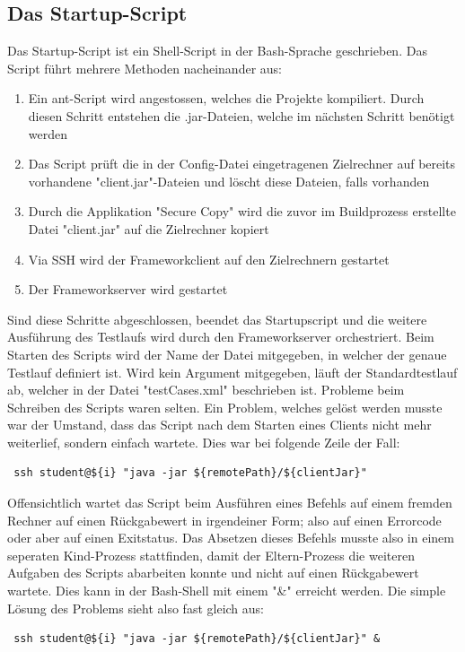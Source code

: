 \subsection{Das Startup-Script}
\label{sec:startupScript}
Das  Startup-Script ist ein Shell-Script in der Bash-Sprache geschrieben. Das Script führt mehrere Methoden nacheinander aus:
\begin{enumerate}
\item Ein ant-Script wird angestossen, welches die Projekte kompiliert. Durch diesen Schritt entstehen die .jar-Dateien, welche im nächsten Schritt benötigt werden
\item Das Script prüft die in der Config-Datei eingetragenen Zielrechner auf bereits vorhandene "client.jar"-Dateien und löscht diese Dateien, falls vorhanden
\item Durch die Applikation "Secure Copy" wird die zuvor im Buildprozess erstellte Datei "client.jar" auf die Zielrechner kopiert
\item Via SSH wird der Frameworkclient auf den Zielrechnern gestartet
\item Der Frameworkserver wird gestartet
\end{enumerate}
Sind diese Schritte abgeschlossen, beendet das Startupscript und die weitere Ausführung des Testlaufs wird durch den Frameworkserver orchestriert.
Beim Starten des Scripts wird der Name der Datei mitgegeben, in welcher der genaue Testlauf definiert ist. Wird kein Argument mitgegeben, läuft der Standardtestlauf ab, welcher in der Datei "testCases.xml" beschrieben ist.
Probleme beim Schreiben des Scripts waren selten. Ein Problem, welches gelöst werden musste war der Umstand, dass das Script nach dem Starten eines Clients nicht mehr weiterlief, sondern einfach wartete. Dies war bei folgende Zeile der Fall:
\begin{lstlisting}	
 ssh student@${i} "java -jar ${remotePath}/${clientJar}"
\end{lstlisting}	
Offensichtlich wartet das Script beim Ausführen eines Befehls auf einem fremden Rechner auf einen Rückgabewert in irgendeiner Form; also auf einen Errorcode oder aber auf einen Exitstatus. Das Absetzen dieses Befehls musste also in einem seperaten Kind-Prozess stattfinden, damit der Eltern-Prozess die weiteren Aufgaben des Scripts abarbeiten konnte und nicht auf einen Rückgabewert wartete. Dies kann in der Bash-Shell mit einem "\&" erreicht werden. Die simple Lösung des Problems sieht also fast gleich aus:
\begin{lstlisting}
 ssh student@${i} "java -jar ${remotePath}/${clientJar}" &
\end{lstlisting}

